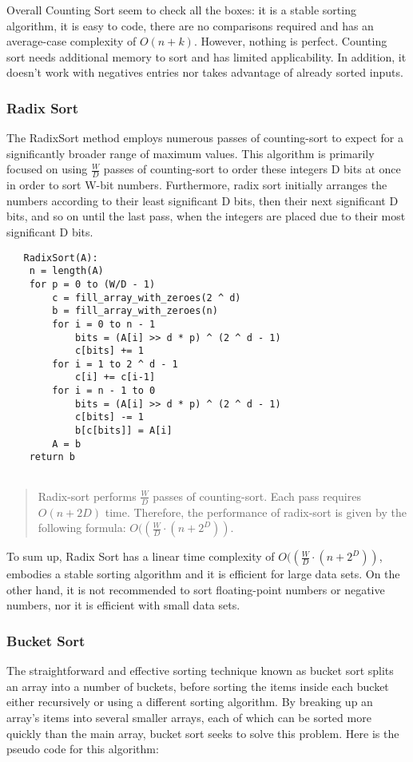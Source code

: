 \documentclass[11pt, letter paper]{article}
\begin{document}
        Overall Counting Sort seem to check all the boxes: it is a stable sorting algorithm, it is easy to code, there are no comparisons required and has an average-case complexity of $O(n + k)$. However, nothing is perfect. Counting sort needs additional memory to sort and has limited applicability. In addition, it doesn't work with negatives entries nor takes advantage of already sorted inputs.

        \subsubsection{Radix Sort}
        The RadixSort method employs numerous passes of counting-sort to expect for a significantly broader range of maximum values.
	This algorithm is primarily focused on using $\frac{W}{D}$ passes of counting-sort to order these integers D bits at once in order to sort W-bit numbers. Furthermore,   radix sort initially arranges the numbers according to their least significant D bits, then their next  significant D bits, and so on until the last pass, when the integers are placed due to their most significant D bits.
        
        \begin{lstlisting}
   RadixSort(A):
	n = length(A)
	for p = 0 to (W/D - 1)
		c = fill_array_with_zeroes(2 ^ d)
		b = fill_array_with_zeroes(n)
		for i = 0 to n - 1
			bits = (A[i] >> d * p) ^ (2 ^ d - 1) 
			c[bits] += 1		
		for i = 1 to 2 ^ d - 1
			c[i] += c[i-1]
		for i = n - 1 to 0
			bits = (A[i] >> d * p) ^ (2 ^ d - 1)
			c[bits] -= 1
			b[c[bits]] = A[i]
		A = b
	return b
	
        \end{lstlisting}

        \begin{quote}
            Radix-sort performs $\frac{W}{D}$ passes of counting-sort. Each pass requires $O(n + 2D)$ time. Therefore, the performance of radix-sort is given by the following formula: $O((\frac{W}{D} \cdot (n + 2 ^ D))$.
        \end{quote}

        To sum up, Radix Sort has a linear time complexity of $O((\frac{W}{D} \cdot (n + 2 ^ D))$, embodies a stable sorting algorithm and it is efficient for large data sets. On the other hand, it is not recommended to sort floating-point numbers or negative numbers, nor it is efficient with small data sets.

        \subsubsection{Bucket Sort}
        The straightforward and effective sorting technique known as bucket sort splits an array into a number of buckets, before sorting the items inside each bucket either recursively or using a different sorting algorithm. By breaking up an array's items into several smaller arrays, each of which can be sorted more quickly than the main array, bucket sort seeks to solve this problem.  Here is the pseudo code for this algorithm: \\
\end{document}
